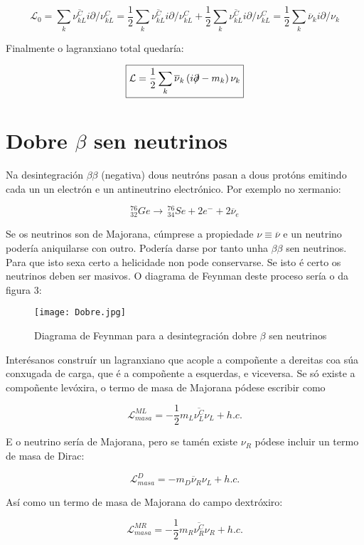 \documentclass[a4paper,10pt]{article}
\newcommand{\beq}{\begin{equation}}
\newcommand{\eeq}{\end{equation}}
\newcommand{\bbx}{\begin{boxed}}
\newcommand{\ebx}{\end{boxed}}
\newcommand{\barra}[1]{\overline{#1}}
\newcommand{\chula}[1]{\mathcal{#1}}
\newcommand{\slx}[1]{ #1\!\!\!/ }
\begin{document}
\beq %
\chula L_0 = \sum_k \barra{\nu_{kL}^C} i \slx\partial \nu_{kL}^C = \frac{1}{2} \sum_k \barra{\nu_{kL}^C} i \slx\partial \nu_{kL}^C + \frac{1}{2} \sum_k \barra{\nu_{kL}^C} i \slx\partial \nu_{kL}^C = \frac{1}{2} \sum_k \barra\nu_k i \slx\partial \nu_k
\eeq

Finalmente o lagranxiano total quedaría:

\beq
\bbx{
\chula L = \frac{1}{2} \sum_k \barra\nu_k \left( i\slx\partial - m_k \right) \nu_k
}\ebx
\eeq

\section{Dobre $\beta$ sen neutrinos}

Na desintegración $\beta\beta$ (negativa) dous neutróns pasan a dous protóns emitindo cada un un electrón e un antineutrino electrónico. Por exemplo no xermanio:

\beq
_{32}^{76}Ge \rightarrow  \, _{34}^{76}Se + 2e^- + 2\barra\nu_e
\eeq

	Se os neutrinos son de Majorana, cúmprese a propiedade $\nu \equiv \barra\nu$ e un neutrino podería aniquilarse con outro. Podería darse por tanto unha $\beta\beta$ sen neutrinos. Para que isto sexa certo a helicidade non pode conservarse. Se isto é certo os neutrinos deben ser masivos. O diagrama de Feynman deste proceso sería o da figura 3:

\begin{figure}[h!]
	\centering
		\texttt{[image: Dobre.jpg]}
	\caption{Diagrama de Feynman para a desintegración dobre $\beta$ sen neutrinos}
\end{figure}

	Interésanos construír un lagranxiano que acople a compoñente a dereitas coa súa conxugada de carga, que é a compoñente a esquerdas, e viceversa. Se só existe a compoñente levóxira, o termo de masa de Majorana pódese escribir como
	
\beq
\chula L_{masa}^{ML} = -\frac{1}{2} m_L \barra{\nu_L^C} \nu_L + h.c.
\eeq

E o neutrino sería de Majorana, pero se tamén existe $\nu_R$ pódese incluir un termo de masa de Dirac:

\beq
\chula L_{masa}^D = - m_D \barra\nu_R \nu_L + h.c.
\eeq

Así como un termo de masa de Majorana do campo dextróxiro:

\beq
\chula L_{masa}^{MR} = -\frac{1}{2} m_R \barra{\nu_R^C} \nu_R + h.c.
\eeq
\end{document}

